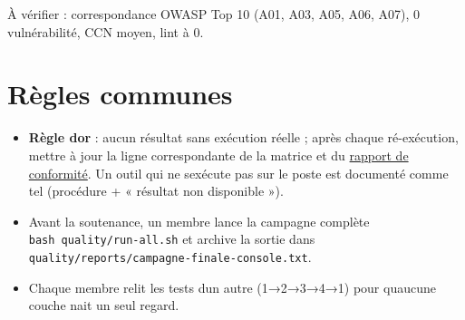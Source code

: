 \documentclass[
  11pt,
]{article}
\providecommand{\tightlist}{%
  \setlength{\itemsep}{0pt}\setlength{\parskip}{0pt}}
\begin{document}
À vérifier : correspondance OWASP Top 10 (A01, A03, A05, A06, A07), 0
vulnérabilité, CCN moyen, lint à 0.

\section{Règles communes}\label{ruxe8gles-communes}

\begin{itemize}
\tightlist
\item
  \textbf{Règle d\textquotesingle or} : aucun résultat sans exécution
  réelle ; après chaque ré-exécution, mettre à jour la ligne
  correspondante de la matrice et du
  \href{RAPPORT_CONFORMITE_ISO25010.pdf}{rapport de conformité}. Un
  outil qui ne s\textquotesingle exécute pas sur le poste est documenté
  comme tel (procédure + « résultat non disponible »).
\item
  Avant la soutenance, un membre lance la campagne complète
  \texttt{bash\ quality/}\allowbreak{}\texttt{run-}\allowbreak{}\texttt{all.}\allowbreak{}\texttt{sh}
  et archive la sortie dans
  \texttt{quality/}\allowbreak{}\texttt{reports/}\allowbreak{}\texttt{campagne-}\allowbreak{}\texttt{finale-}\allowbreak{}\texttt{console.}\allowbreak{}\texttt{txt}.
\item
  Chaque membre relit les tests d\textquotesingle un autre (1→2→3→4→1)
  pour qu\textquotesingle aucune couche n\textquotesingle ait un seul
  regard.
\end{itemize}
\end{document}
